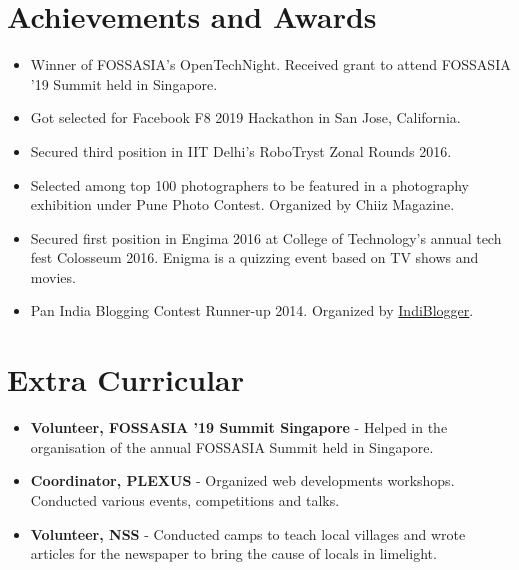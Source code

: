 \documentclass[margin, centered] {res}
\begin{document}
\begin{resume}
\section{Achievements and Awards}
\begin{itemize}[leftmargin=*]
\item Winner of FOSSASIA's OpenTechNight. Received grant to attend FOSSASIA '19 Summit held in Singapore.
\item Got selected for Facebook F8 2019 Hackathon in San Jose, California.
\item Secured third position in IIT Delhi's RoboTryst Zonal Rounds 2016.
\item Selected among top 100 photographers to be featured in a photography exhibition under Pune Photo Contest. Organized by Chiiz Magazine.
\item Secured first position in Engima 2016 at College of Technology's annual tech fest Colosseum 2016. Enigma is a quizzing event based on TV shows and movies.
\item Pan India Blogging Contest Runner-up 2014. Organized by {\href{https://www.indiblogger.in/}{IndiBlogger}}.

\end{itemize}


\section{Extra Curricular}
\begin{itemize}[leftmargin=*]
\item  \textbf{Volunteer, FOSSASIA '19 Summit Singapore} - Helped in the organisation of the annual FOSSASIA Summit held in Singapore.
\item  \textbf{Coordinator, PLEXUS} - Organized web developments workshops. Conducted various events, competitions and talks.
\item  \textbf{Volunteer, NSS} - Conducted camps to teach local villages and wrote articles for the newspaper to bring the cause of locals in limelight.
\end{itemize}



\end{resume}
\end{document}
